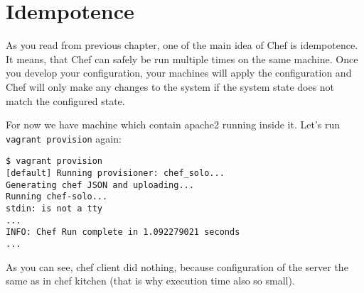 \section{Idempotence}
\label{sec:solo-idempotence}

As you read from previous chapter, one of the main idea of Chef is idempotence. It means, that Chef can safely be run multiple times on the same machine. Once you develop your configuration, your machines will apply the configuration and Chef will only make any changes to the system if the system state does not match the configured state.

For now we have machine which contain apache2 running inside it. Let's run \lstinline!vagrant provision! again:

\begin{lstlisting}[label=lst:my-cloud-idempotence1]
$ vagrant provision
[default] Running provisioner: chef_solo...
Generating chef JSON and uploading...
Running chef-solo...
stdin: is not a tty
...
INFO: Chef Run complete in 1.092279021 seconds
...
\end{lstlisting}

As you can see, chef client did nothing, because configuration of the server the same as in chef kitchen (that is why execution time also so small).
